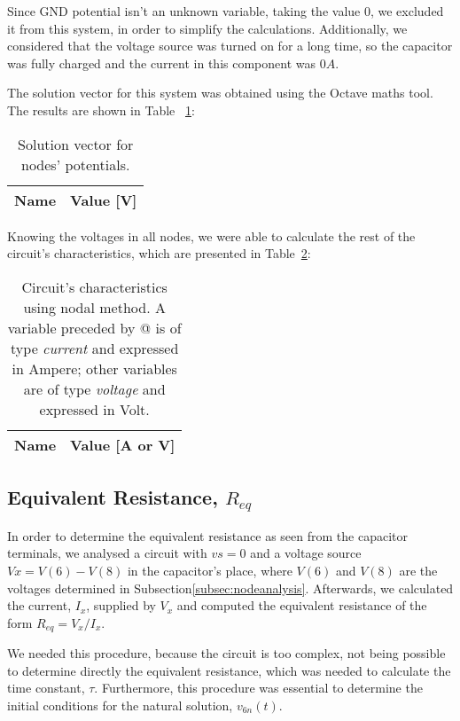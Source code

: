 Since GND potential isn't an unknown variable, taking the value 0, we excluded it from this system, in order to simplify the calculations. Additionally, we considered that the voltage source was turned on for a long time, so the capacitor was fully charged and the current in this component was $0A$.

The solution vector for this system was obtained using the Octave maths tool. The results are shown in Table ~\ref{tab:node1}:

\begin{table}[H]
  \centering
  \begin{tabular}{|l|r|}
    \hline    
    {\bf Name} & {\bf Value [V]} \\ \hline
    
  \end{tabular}
  \caption{Solution vector for nodes' potentials.}
  \label{tab:node1}
\end{table}

Knowing the voltages in all nodes, we were able to calculate the rest of the circuit's characteristics, which are presented in Table~\ref{tab:nodetab1}:

\begin{table}[H]
  \centering
  \begin{tabular}{|l|r|}
    \hline    
    {\bf Name} & {\bf Value [A or V]} \\ \hline
    
  \end{tabular}
  \caption{Circuit's characteristics using nodal method. A variable preceded by @ is of type {\em current}
    and expressed in Ampere; other variables are of type {\it voltage} and expressed in
    Volt.}
  \label{tab:nodetab1}
\end{table}

\subsection{Equivalent Resistance, $R_{eq}$}
\label{subsec:eqresist}

In order to determine the equivalent resistance as seen from the capacitor terminals, we analysed a circuit with $vs=0$ and a voltage source $Vx = V(6)-V(8)$ in the capacitor's place, where $V(6)$ and $V(8)$ are the voltages determined in Subsection\ref{subsec:nodeanalysis}. Afterwards, we calculated the current, $I_x$, supplied by $V_x$ and computed the equivalent resistance of the form $R_{eq}=V_x/I_x$.

We needed this procedure, because the circuit is too complex, not being possible to determine directly the equivalent resistance, which was needed to calculate the time constant, $\tau$. Furthermore, this procedure was essential to determine the initial conditions for the natural solution, $v_{6n}(t)$.


